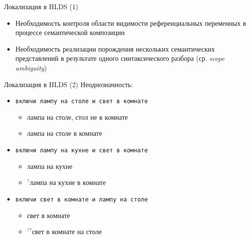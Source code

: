 \documentclass{beamer}
\begin{document}
\begin{frame}{Локализация в HLDS (1)}
\begin{itemize}
	\item Необходимость контроля области видимости референциальных переменных в процессе семантической композиции
	\item Необходимость реализации порождения нескольких семантических представлений в результате одного синтаксического разбора (ср. \textit{scope ambiguity})
\end{itemize}
\end{frame}

\begin{frame}{Локализация в HLDS (2)}
Неоднозначность:\\
\bigskip
\begin{itemize}
	\item \texttt{включи лампу на столе и свет в комнате}
		\begin{itemize}
			\item {\footnotesize лампа на столе, стол не в комнате}
			\item {\footnotesize лампа на столе в комнате}
		\end{itemize}
	\bigskip
	\item \texttt{включи лампу на кухне и свет в комнате}
		\begin{itemize}
			\item {\footnotesize лампа на кухне}
			\item {\footnotesize $^?$лампа на кухне в комнате}
		\end{itemize}
	\bigskip
	\item \texttt{включи свет в комнате и лампу на столе}
		\begin{itemize}
			\item {\footnotesize свет в комнате}
			\item {\footnotesize $^{??}$свет в комнате на столе}
		\end{itemize}
\end{itemize}
\end{frame}
\end{document}

